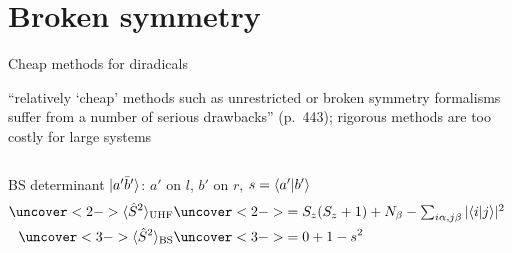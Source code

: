 \section{Broken symmetry}

\begin{frame}{Cheap methods for diradicals}
  \begin{paperclaim}
    ``relatively `cheap' methods such as unrestricted or broken symmetry formalisms suffer from a number of serious
    drawbacks'' (p.\ 443); rigorous methods are too costly for large systems
  \end{paperclaim}
  \begin{columns}[c]
    BS determinant $\lvert a'\bar b'\rangle$: $a'$ on $l$, $b'$ on $r$, $s=\langle a'\vert b'\rangle$
    \begin{align*}
      \uncover<2->{\ev{\hat S^2}_{\text{UHF}}}&\uncover<2->{=S_z(S_z+1)+N_\beta-\textstyle\sum_{i\alpha,j\beta}|\braket ij|^2}\\
      \uncover<3->{\ev{\hat S^2}_{\text{BS}}}&\uncover<3->{=0+1-s^2}
    \end{align*}
  \end{columns}
\end{frame}

